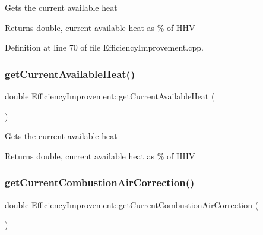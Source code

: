 Gets the current available heat

\begin{DoxyReturn}{Returns}
double, current available heat as \% of H\+HV 
\end{DoxyReturn}


Definition at line 70 of file Efficiency\+Improvement.\+cpp.

\mbox{\label{class_efficiency_improvement_a4f1ef470ee88c9d3ac05be0bd5755157}} 
\subsubsection{\texorpdfstring{get\+Current\+Available\+Heat()}{getCurrentAvailableHeat()}\hspace{0.1cm}{\footnotesize\ttfamily [3/3]}}
{\footnotesize\ttfamily double Efficiency\+Improvement\+::get\+Current\+Available\+Heat (\begin{DoxyParamCaption}{ }\end{DoxyParamCaption})}

Gets the current available heat

\begin{DoxyReturn}{Returns}
double, current available heat as \% of H\+HV 
\end{DoxyReturn}
\mbox{\label{class_efficiency_improvement_af50c396ac8ee18f594d6e8b8814f056a}} 
\subsubsection{\texorpdfstring{get\+Current\+Combustion\+Air\+Correction()}{getCurrentCombustionAirCorrection()}\hspace{0.1cm}{\footnotesize\ttfamily [1/3]}}
{\footnotesize\ttfamily double Efficiency\+Improvement\+::get\+Current\+Combustion\+Air\+Correction (\begin{DoxyParamCaption}{ }\end{DoxyParamCaption})}

